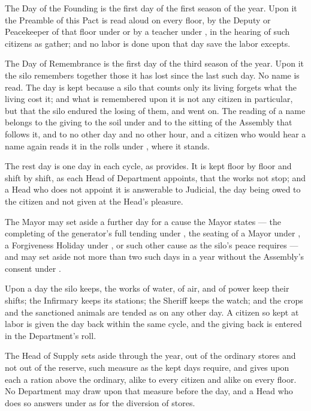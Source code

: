 \begin{clauses}
\item The Day of the Founding is the first day of the first season of the year. Upon it the Preamble of this Pact is read aloud on every floor, by the Deputy or Peacekeeper of that floor under  or by a teacher under , in the hearing of such citizens as gather; and no labor is done upon that day save the labor  excepts.
\item The Day of Remembrance is the first day of the third season of the year. Upon it the silo remembers together those it has lost since the last such day. No name is read. The day is kept because a silo that counts only its living forgets what the living cost it; and what is remembered upon it is not any citizen in particular, but that the silo endured the losing of them, and went on. The reading of a name belongs to the giving to the soil under  and to the sitting of the Assembly that follows it, and to no other day and no other hour, and a citizen who would hear a name again reads it in the rolls under , where it stands.
\item The rest day is one day in each cycle, as  provides. It is kept floor by floor and shift by shift, as each Head of Department appoints, that the works not stop; and a Head who does not appoint it is answerable to Judicial, the day being owed to the citizen and not given at the Head's pleasure.
\item The Mayor may set aside a further day for a cause the Mayor states --- the completing of the generator's full tending under , the seating of a Mayor under , a Forgiveness Holiday under , or such other cause as the silo's peace requires --- and may set aside not more than two such days in a year without the Assembly's consent under .
\item Upon a day the silo keeps, the works of water, of air, and of power keep their shifts; the Infirmary keeps its stations; the Sheriff keeps the watch; and the crops and the sanctioned animals are tended as on any other day. A citizen so kept at labor is given the day back within the same cycle, and the giving back is entered in the Department's roll.
\item The Head of Supply sets aside through the year, out of the ordinary stores and not out of the reserve, such measure as the kept days require, and gives upon each a ration above the ordinary, alike to every citizen and alike on every floor. No Department may draw upon that measure before the day, and a Head who does so answers under  as for the diversion of stores.

\end{clauses}
